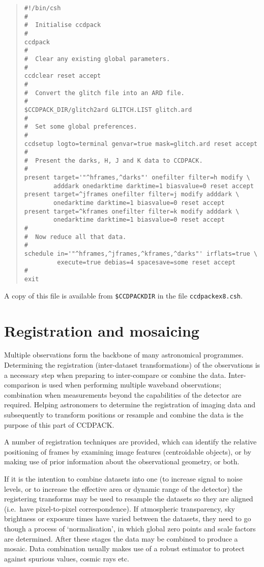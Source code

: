 \documentclass[twoside,11pt]{article}
\newcommand{\latexhtml}[2]{#1}
\newcommand{\xlabel}[1]{}
\renewcommand{\_}{\texttt{\symbol{95}}}
\newcommand{\ttsize}{\latexhtml{\small}{}}
\newenvironment{myquote}{\begin{quote}\ttsize}{\end{quote}}
\newcommand{\text}[1]{{\ttsize \tt #1}}
\begin{document}
\begin{myquote}
\begin{verbatim}
#!/bin/csh
#
#  Initialise ccdpack
#
ccdpack
#
#  Clear any existing global parameters.
#
ccdclear reset accept
#
#  Convert the glitch file into an ARD file.
#
$CCDPACK_DIR/glitch2ard GLITCH.LIST glitch.ard
#
#  Set some global preferences.
#
ccdsetup logto=terminal genvar=true mask=glitch.ard reset accept
#
#  Present the darks, H, J and K data to CCDPACK.
#
present target='"^hframes,^darks"' onefilter filter=h modify \
        adddark onedarktime darktime=1 biasvalue=0 reset accept
present target=^jframes onefilter filter=j modify adddark \
        onedarktime darktime=1 biasvalue=0 reset accept
present target=^kframes onefilter filter=k modify adddark \
        onedarktime darktime=1 biasvalue=0 reset accept
#
#  Now reduce all that data.
#
schedule in='"^hframes,^jframes,^kframes,^darks"' irflats=true \
         execute=true debias=4 spacesave=some reset accept
#
exit
\end{verbatim}
\end{myquote}
A copy of this file is available from
\text{\$CCDPACK\_DIR} in the file \text{ccdpack\_ex8.csh}.



\section{Registration and mosaicing\label{mosaicing}\xlabel{mosaicing}}

Multiple observations form the backbone of many astronomical programmes.
Determining the registration (inter-dataset transformations) of the
observations is a necessary step when preparing to inter-compare or
combine the data. Inter-comparison is used when performing multiple
waveband observations; combination when measurements beyond the
capabilities of the detector are required. Helping astronomers to
determine the registration of imaging data and subsequently to transform
positions or resample and combine the data is the purpose of this part
of CCDPACK.

A number of registration techniques are provided, which can
identify the relative positioning of frames by examining image
features (centroidable objects), or by making use of prior information
about the observational geometry, or both.

If it is the intention to combine datasets
into one (to increase signal to noise levels, or to increase the
effective area or dynamic range of the detector) the registering
transforms may be used to resample the datasets so they are aligned
(i.e.\ have pixel-to-pixel correspondence).  If atmospheric
transparency, sky brightness or exposure times have varied between the
datasets, they need to go though a process of `normalisation', in
which global zero points and scale factors are determined. After these
stages the data may be combined to produce a mosaic. Data combination
usually makes use of a robust estimator to protect against spurious
values, cosmic rays etc.
\end{document}
